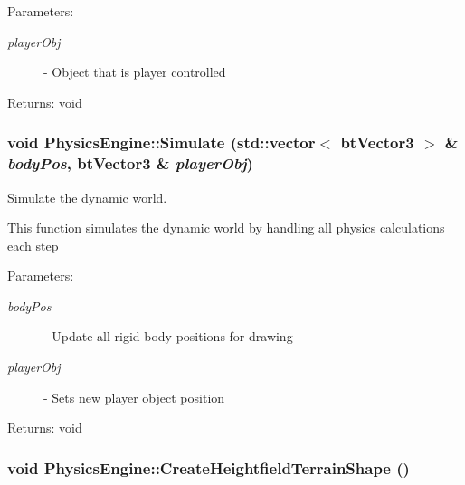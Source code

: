 \begin{Desc}
\item[Parameters:]
\begin{description}
\item[{\em playerObj}]- Object that is player controlled\end{description}
\end{Desc}
\begin{Desc}
\item[Returns:]void \end{Desc}
\hypertarget{class_physics_engine_9d6bec05e95efd4b9168b507a90883b9}{
\subsubsection[Simulate]{\setlength{\rightskip}{0pt plus 5cm}void PhysicsEngine::Simulate (std::vector$<$ btVector3 $>$ \& {\em bodyPos}, \/  btVector3 \& {\em playerObj})}}
\label{class_physics_engine_9d6bec05e95efd4b9168b507a90883b9}


Simulate the dynamic world. 

This function simulates the dynamic world by handling all physics calculations each step

\begin{Desc}
\item[Parameters:]
\begin{description}
\item[{\em bodyPos}]- Update all rigid body positions for drawing \item[{\em playerObj}]- Sets new player object position\end{description}
\end{Desc}
\begin{Desc}
\item[Returns:]void \end{Desc}
\hypertarget{class_physics_engine_f951fe2e462f4b487b653199298a1bb3}{
\subsubsection[CreateHeightfieldTerrainShape]{\setlength{\rightskip}{0pt plus 5cm}void PhysicsEngine::CreateHeightfieldTerrainShape ()}}
\label{class_physics_engine_f951fe2e462f4b487b653199298a1bb3}


